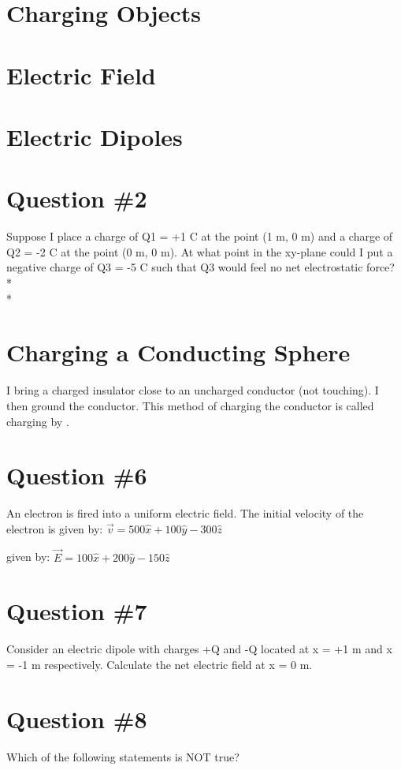 \documentclass[12pt]{article}
\begin{document}
\section{Charging Objects}
\section{Electric Field}
\section{Electric Dipoles}



\section*{Question \#2}
Suppose I place a charge of Q1 = +1 C at the point (1 m, 0 m) and a charge of Q2 = -2 C at the point (0 m, 0 m).  At what point in the xy-plane could I put a negative charge of Q3 = -5 C such that Q3 would feel no net electrostatic force?\\*\\*


\section*{Charging a Conducting Sphere}
I bring a charged insulator close to an uncharged conductor (not touching).  I then ground the conductor.  This method of charging the conductor is called charging by \underline{\hspace{1cm}}.



\section*{Question \#6}
An electron is fired into a uniform electric field.  The initial velocity of the electron is given by:
$\vec{v} = 500 \hat{x} + 100 \hat{y} - 300 \hat{z}$

 given by:
$\vec{E} = 100 \hat{x} + 200 \hat{y} - 150 \hat{z}$

\section*{Question \#7}
Consider an electric dipole with charges +Q and -Q located at x = +1 m and x = -1 m respectively.  Calculate the net electric field at x = 0 m.

\section*{Question \#8}
Which of the following statements is NOT true?
\end{document}
